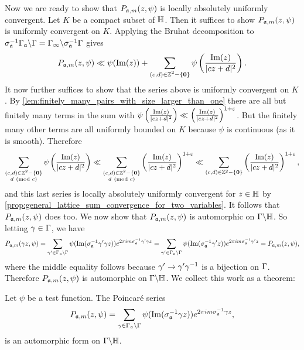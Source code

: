       Now we are ready to show that $P_{\mathfrak{a},m}(z,\psi)$ is locally absolutely uniformly convergent. Let $K$ be a compact subset of $\mathbb{H}$. Then it suffices to show $P_{\mathfrak{a},m}(z,\psi)$ is uniformly convergent on $K$. Applying the Bruhat decomposition to $\sigma_{\mathfrak{a}}^{-1}\Gamma_{\mathfrak{a}}\backslash\Gamma = \Gamma_{\infty}\backslash\sigma_{\mathfrak{a}}^{-1}\Gamma$ gives
      \[
        P_{\mathfrak{a},m}(z,\psi) \ll \psi(\mathrm{Im}(z))+\sum_{\substack{(c,d) \in \mathbb{Z}^{2}-\{\mathbf{0}\}}}\psi\left(\frac{\mathrm{Im}(z)}{|cz+d|^{2}}\right).
      \]
      It now further suffices to show that the series above is uniformly convergent on $K$. By \cref{lem:finitely_many_pairs_with_size_larger_than_one} there are all but finitely many terms in the sum with $\psi\left(\frac{\mathrm{Im}(z)}{|cz+d|^{2}}\right) \ll \left(\frac{\mathrm{Im}(z)}{|cz+d|^{2}}\right)^{1+\varepsilon}$. But the finitely many other terms are all uniformly bounded on $K$ because $\psi$ is continuous (as it is smooth). Therefore
      \[
        \sum_{\substack{(c,d) \in \mathbb{Z}^{2}-\{\mathbf{0}\} \\ d \ \left(\text{mod }c\right)}}\psi\left(\frac{\mathrm{Im}(z)}{|cz+d|^{2}}\right) \ll \sum_{\substack{(c,d) \in \mathbb{Z}^{2}-\{\mathbf{0}\} \\ d \ \left(\text{mod }c\right)}}\left(\frac{\mathrm{Im}(z)}{|cz+d|^{2}}\right)^{1+\varepsilon} \ll \sum_{(c,d) \in \mathbb{Z}^{2}-\{\mathbf{0}\}}\left(\frac{\mathrm{Im}(z)}{|cz+d|^{2}}\right)^{1+\varepsilon},
      \]
      and this last series is locally absolutely uniformly convergent for $z \in \mathbb{H}$ by \cref{prop:general_lattice_sum_convergence_for_two_variables}. It follows that $P_{\mathfrak{a},m}(z,\psi)$ does too. We now show that $P_{\mathfrak{a},m}(z,\psi)$ is automorphic on $\Gamma\backslash\mathbb{H}$. So letting $\gamma \in \Gamma$, we have
      \[
        P_{\mathfrak{a},m}(\gamma z,\psi) = \sum_{\gamma' \in \Gamma_{\mathfrak{a}}\backslash\Gamma}\psi(\mathrm{Im}(\sigma_{\mathfrak{a}}^{-1}\gamma'\gamma z))e^{2\pi im\sigma_{\mathfrak{a}}^{-1}\gamma'\gamma z} = \sum_{\gamma' \in \Gamma_{\mathfrak{a}}\backslash\Gamma}\psi(\mathrm{Im}(\sigma_{\mathfrak{a}}^{-1}\gamma' z))e^{2\pi im\sigma_{\mathfrak{a}}^{-1}\gamma' z} = P_{\mathfrak{a},m}(z,\psi),
      \]
      where the middle equality follows because $\gamma' \to \gamma'\gamma^{-1}$ is a bijection on $\Gamma$. Therefore $P_{\mathfrak{a},m}(z,\psi)$ is automorphic on $\Gamma\backslash\mathbb{H}$. We collect this work as a theorem:

      \begin{theorem}
        Let $\psi$ be a test function. The Poincar\'e series
      \[
        P_{\mathfrak{a},m}(z,\psi) = \sum_{\gamma \in \Gamma_{\mathfrak{a}}\backslash\Gamma}\psi(\mathrm{Im}(\sigma_{\mathfrak{a}}^{-1}\gamma z))e^{2\pi im\sigma_{\mathfrak{a}}^{-1}\gamma z},
      \]
      is an automorphic form on $\Gamma\backslash\mathbb{H}$.
      \end{theorem}
